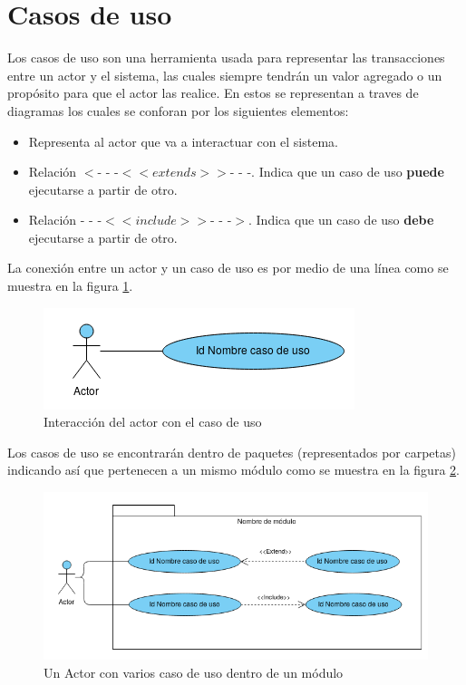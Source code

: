 \section{Casos de uso}


%
%
%

Los casos de uso son una herramienta usada para representar las transacciones entre un actor y el sistema, las cuales siempre tendrán un valor agregado o un propósito para que el actor las realice.
En estos se representan a traves de diagramas los cuales se conforan por los siguientes elementos:

\begin{itemize}
	 \UCpaso Representa al sistema mediante un óvalo.
	\item \UCactor Representa al actor que va a interactuar con el sistema.
	\item Relación $<$- - -$<<extends>>$- - -. Indica que un caso de uso \textbf{puede} ejecutarse a partir de otro.
	\item Relación - - -$<<include>>$- - -$>$. Indica que un caso de uso \textbf{debe} ejecutarse a partir de otro.
\end{itemize}

La conexión entre un actor y un caso de uso es por medio de una línea como se muestra en la figura \ref{fig:acUC}.

\begin{figure}[hbtp!]
	\begin{center}
		\includegraphics[width=.4\textwidth]{LIT/ActorUC}
	\end{center}
	\label{fig:acUC}
	\caption{Interacción del actor con el caso de uso}
\end{figure}

Los casos de uso se encontrarán dentro de paquetes (representados por carpetas) indicando así que pertenecen a un mismo módulo como se muestra en la figura \ref{fig:pack}.

\begin{figure}[hbtp!]
	\begin{center}
		\includegraphics[width=.7\textwidth]{LIT/Paquete}
	\end{center}
	\label{fig:pack}
	\caption{Un Actor con varios caso de uso dentro de un módulo}
\end{figure}

